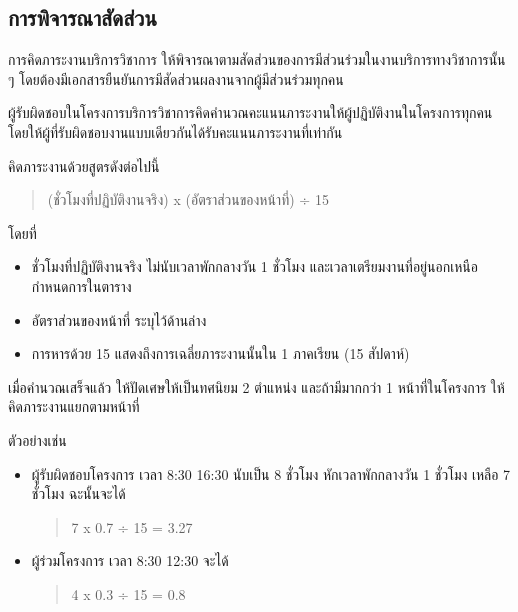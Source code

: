 \documentclass[a4paper,12pt,english]{sphinxmanual}
\begin{document}
\subsection{การพิจารณาสัดส่วน}
\label{\detokenize{workload_rubric:id52}}
การคิดภาระงานบริการวิชาการ ให้พิจารณาตามสัดส่วนของการมีส่วนร่วมในงานบริการทางวิชาการนั้น ๆ โดยต้องมีเอกสารยืนยันการมีสัดส่วนผลงานจากผู้มีส่วนร่วมทุกคน

ผู้รับผิดชอบในโครงการบริการวิชาการคิดคำนวณคะแนนภาระงานให้ผู้ปฏิบัติงานในโครงการทุกคน โดยให้ผู้ที่รับผิดชอบงานแบบเดียวกันได้รับคะแนนภาระงานที่เท่ากัน

คิดภาระงานด้วยสูตรดังต่อไปนี้
\begin{quote}

(ชั่วโมงที่ปฏิบัติงานจริง) x (อัตราส่วนของหน้าที่) ÷ 15
\end{quote}

โดยที่
\begin{itemize}
\item {} 
ชั่วโมงที่ปฏิบัติงานจริง ไม่นับเวลาพักกลางวัน 1 ชั่วโมง และเวลาเตรียมงานที่อยู่นอกเหนือกำหนดการในตาราง

\item {} 
อัตราส่วนของหน้าที่ ระบุไว้ด้านล่าง

\item {} 
การหารด้วย 15 แสดงถึงการเฉลี่ยภาระงานนั้นใน 1 ภาคเรียน (15 สัปดาห์)

\end{itemize}

เมื่อคำนวณเสร็จแล้ว ให้ปัดเศษให้เป็นทศนิยม 2 ตำแหน่ง และถ้ามีมากกว่า 1 หน้าที่ในโครงการ ให้คิดภาระงานแยกตามหน้าที่

ตัวอย่างเช่น
\begin{itemize}
\item {} 
ผู้รับผิดชอบโครงการ เวลา 8:30 \sphinxhyphen{} 16:30 นับเป็น 8 ชั่วโมง หักเวลาพักกลางวัน 1 ชั่วโมง เหลือ 7 ชั่วโมง ฉะนั้นจะได้
\begin{quote}

7 x 0.7 ÷ 15 = 3.27
\end{quote}

\item {} 
ผู้ร่วมโครงการ เวลา 8:30 \sphinxhyphen{} 12:30 จะได้
\begin{quote}

4 x 0.3 ÷ 15 = 0.8
\end{quote}

\end{itemize}
\end{document}
